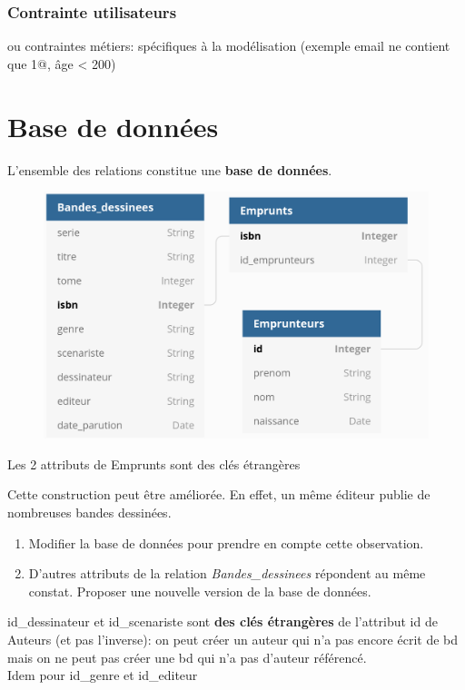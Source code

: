 \documentclass[a4paper,11pt]{article}
\begin{document}
\begin{Form}
\begin{commentprof}
\subsubsection{Contrainte utilisateurs}
ou contraintes métiers: spécifiques à la modélisation (exemple email ne contient que 1@, âge < 200)
\end{commentprof}
\section{Base de données}
\begin{aretenir}[]
L'ensemble des relations constitue une \textbf{base de données}.
\end{aretenir}
\begin{figure}[!h]
\centering
\includegraphics[width=12cm]{ressources/cle_etrangere.png}
\label{bdd}
\end{figure}
\begin{commentprof}
Les 2 attributs de Emprunts sont des clés étrangères
\end{commentprof}
\begin{activite}
Cette construction peut être améliorée. En effet, un même éditeur publie de nombreuses bandes dessinées.
\begin{enumerate}
\item Modifier la base de données pour prendre en compte cette observation.
\item D'autres attributs de la relation \emph{Bandes\_dessinees} répondent au même constat. Proposer une nouvelle version de la base de données.
\end{enumerate}
\begin{commentprof}
id\_dessinateur et id\_scenariste sont \textbf{des clés étrangères} de l'attribut id de Auteurs (et pas l'inverse): on peut créer un auteur qui n'a pas encore écrit de bd mais on ne peut pas créer une bd qui n'a pas d'auteur référencé.\\
Idem pour id\_genre et id\_editeur
\end{commentprof}
\end{activite}
\end{Form}
\end{document}
